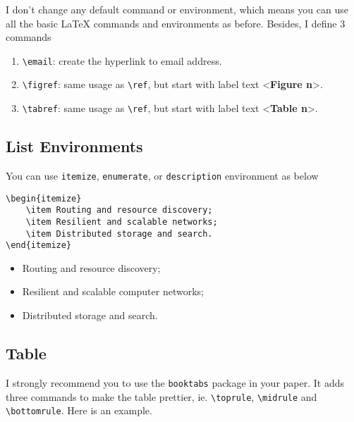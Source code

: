\documentclass[en]{elegantpaper}
\begin{document}
I don't change any default command or environment, which means you can use all the basic \LaTeX{} commands and environments as before.  Besides, I define 3 commands
\begin{enumerate}
	\item \lstinline{\email}: create the hyperlink to email address.
	\item \lstinline{\figref}: same usage as \lstinline{\ref}, but start with label text <\textbf{Figure n}>.
	\item \lstinline{\tabref}: same usage as \lstinline{\ref}, but start with label text <\textbf{Table n}>.
\end{enumerate}{}

\subsection{List Environments}
You can use \lstinline{itemize}, \lstinline{enumerate}, or \lstinline{description} environment as below\\
\begin{minipage}[c]{0.50\linewidth}
\begin{lstlisting}
\begin{itemize}
    \item Routing and resource discovery;
    \item Resilient and scalable networks;
    \item Distributed storage and search.
\end{itemize}
\end{lstlisting}
\end{minipage}
\begin{minipage}[c]{0.48\linewidth}
\begin{itemize}
	\item Routing and resource discovery;
	\item Resilient and scalable computer networks;
	\item Distributed storage and search.
\end{itemize}
\end{minipage}

\subsection{Table}
I strongly recommend you to use the \lstinline{booktabs} package in your paper. It adds three commands to make the table prettier, ie. \lstinline{\toprule}, \lstinline{\midrule} and \lstinline{\bottomrule}. Here is an example.
\end{document}
